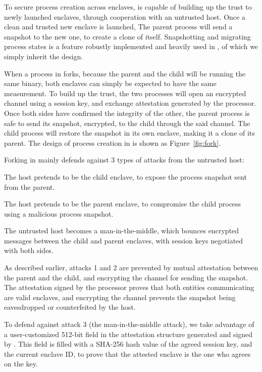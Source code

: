 To secure process creation across enclaves,
\sysname{} is capable of building up the trust to newly launched enclaves,
through cooperation with an untrusted host.
Once a clean and trusted new enclave is launched,
The parent process will send a snapshot to the new one,
to create a clone of itself.
Snapshotting and migrating process states
is a feature robustly implemented and heavily used in \graphene{} \libos{},
of which we simply inherit the design.

When a process in \sysname{} forks,
because the parent and the child will be running the same binary,
both enclaves can simply be expected to have the same measurement.
To build up the trust, the two processes will open an encrypted channel
using a session key,
and exchange attestation generated by the processor.
Once both sides have confirmed the integrity of the other,
the parent process is safe to send its snapshot, encrypted, to the child
through the said channel.
The child process will restore the snapshot in its own enclave,
making it a clone of its parent.
The design of process creation in \sysname{} is shown as Figure~\ref{fig:fork}.

Forking in \sysname{} mainly defends against 3 types of attacks
from the untrusted host:

\begin{compactenum}

\item The host pretends to be the child enclave, to expose the process snapshot
sent from the parent.

\item The host pretends to be the parent enclave, to compromise the
child process using a malicious process snapshot.

\item The untrusted host becomes a man-in-the-middle, which bounces
encrypted messages between the child and parent enclaves, with session keys
negotiated with both sides.

\end{compactenum}

As described earlier, attacks 1 and 2 are prevented by mutual attestation
between the parent and the child,
and encrypting the channel for sending the snapshot.
The attestation signed by the processor proves that both entities communicating
are valid \sysname{} enclaves,
and encrypting the channel prevents the snapshot being eavesdropped or
counterfeited by the host.

To defend against attack 3 (the man-in-the-middle attack), we take advantage of
a user-customized 512-bit field
in the attestation structure generated and signed by \sgx{}.
This field is filled with a SHA-256 hash value of the agreed session key,
and the current enclave ID,
to prove that the attested enclave is the one who agrees on the key.


